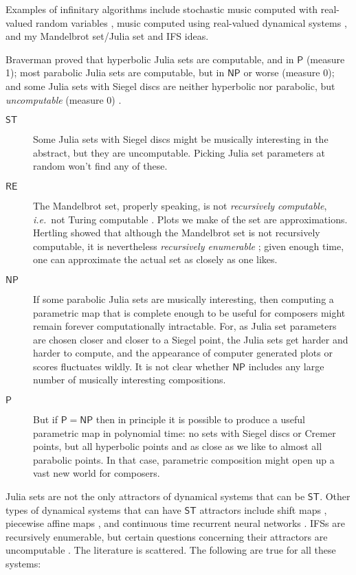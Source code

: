 \documentclass[]{interact}
\theoremstyle{plain}%
\theoremstyle{definition}
\theoremstyle{remark}
\begin{document}
Examples of infinitary algorithms include stochastic music computed with real-valued random variables \citep{xenakis2001formalized}, music computed using real-valued dynamical systems \citep{voss1975noise, gardner1978fractal, beyls1991chaos}, and my Mandelbrot set/Julia set and IFS ideas. 

Braverman proved that hyperbolic Julia sets are computable, and in $\mathsf{P}$ (measure 1); most parabolic Julia sets are computable, but in $\mathsf{NP}$ or worse (measure 0); and some Julia sets with Siegel discs are neither hyperbolic nor parabolic, but \emph{uncomputable} (measure 0) \citep{braverman2006non, braverman2008computability, braverman2009computability}.
\begin{description}
\item[$\mathsf{ST}$]  Some Julia sets with Siegel discs might be musically interesting in the abstract, but they are uncomputable. Picking Julia set parameters at random won't find any of these.
\item[$\mathsf{RE}$] The Mandelbrot set, properly speaking, is not \emph{recursively computable}, \emph{i.e.}\ not Turing computable \citep{blum1993godel}. Plots we make of the set are approximations. Hertling showed that although the Mandelbrot set is not recursively computable, it is nevertheless \emph{recursively enumerable} \citep{Hertling2005-HERITM-3}; given enough time, one can approximate the actual set as closely as one likes. 
\item[$\mathsf{NP}$] If some parabolic Julia sets are musically interesting, then computing a parametric map that is complete enough to be useful for composers might remain forever computationally intractable. For, as Julia set parameters are chosen closer and closer to a Siegel point, the Julia sets get harder and harder to compute, and the appearance of computer generated plots or scores fluctuates wildly. It is not clear whether $\mathsf{NP}$ includes any large number of musically interesting compositions.
\item[$\mathsf{P}$] But if $\mathsf{P} = \mathsf{NP}$ then in principle it is possible to produce a useful parametric map in polynomial time: no sets with Siegel discs or Cremer points, but all hyperbolic points and as close as we like to almost all parabolic points. In that case, parametric composition might open up a vast new world for composers.
\end{description}

Julia sets are not the only attractors of dynamical systems that can be $\mathsf{ST}$. Other types of dynamical systems that can have $\mathsf{ST}$ attractors include shift maps \citep{moore1991generalized}, piecewise affine maps \citep{Bazille_2018}, and continuous time recurrent neural networks \citep{10531294}. IFSs are recursively enumerable, but certain questions concerning their attractors are uncomputable \citep{dube1993undecidable}. The literature is scattered. The following are true for all these systems:
\end{document}
